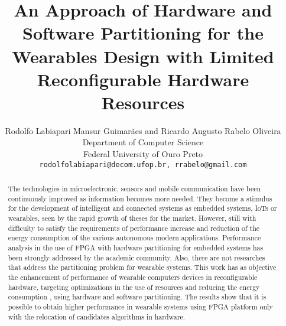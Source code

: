 \documentclass[a4paper, 10pt, conference]{ieeeconf}      %
\title{\LARGE \bf
An Approach of Hardware and Software Partitioning for the Wearables Design with Limited Reconfigurable Hardware Resources
}
\author{ \parbox{6 in}{\centering Rodolfo Labiapari Mansur Guimarães and Ricardo Augusto Rabelo Oliveira \\
         Department of Computer Science \\
         Federal University of Ouro Preto \\
         {\tt\small rodolfolabiapari@decom.ufop.br, rrabelo@gmail.com}}
}
\begin{document}
\maketitle
\thispagestyle{empty}
\pagestyle{empty}

\begin{abstract}

The technologies in microelectronic, sensors and mobile communication have been continuously improved as information becomes more needed.
They become a stimulus for the development of intelligent and connected systems as embedded systems, IoTs or wearables, seen by the rapid growth of theses for the market.
However, still with difficulty to satisfy the requirements of performance increase and reduction of the energy consumption of the various autonomous modern applications.
%
Performance analysis in the use of FPGA with hardware partitioning for embedded systems has been strongly addressed by the academic community.
Also, there are not researches that address the partitioning problem for wearable systems.
%
This work has as objective the enhancement of performance of wearable computers devices in reconfigurable hardware, targeting optimizations in the use of resources and reducing the energy consumption
%
, using hardware and software partitioning.
%
The results show that it is possible to obtain higher performance in wearable systems using FPGA platform only with the relocation of candidates algorithms in hardware.



\end{abstract}
\end{document}
